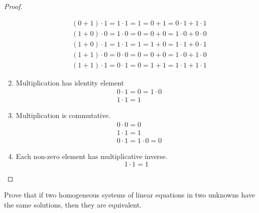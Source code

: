 \begin{proof}
\begin{enumerate}[label = (\arabic*)]
\[\begin{split}
                      &(0 + 1)\cdot 1 = 1\cdot 1 = 1 = 0 + 1 = 0\cdot 1 + 1\cdot 1 \\
                      &(1 + 0)\cdot 0 = 1\cdot 0 = 0 = 0 + 0 = 1\cdot 0 + 0\cdot 0 \\
                      &(1 + 0)\cdot 1 = 1\cdot 1 = 1 = 1 + 0 = 1\cdot 1 + 0\cdot 1 \\
                      &(1 + 1)\cdot 0 = 0\cdot 0 = 0 = 0 + 0 = 1\cdot 0 + 1\cdot 0 \\
                      &(1 + 1)\cdot 1 = 0\cdot 1 = 0 = 1 + 1 = 1\cdot 1 + 1\cdot 1
                  \end{split}
              \]
        \item Multiplication has identity element
              \[
                  \begin{split}
                      &0\cdot 1 = 0 = 1\cdot 0 \\
                      &1\cdot 1 = 1
                  \end{split}
              \]
        \item Multiplication is commutative.
              \[
                  \begin{split}
                      &0\cdot 0 = 0 \\
                      &1\cdot 1 = 1 \\
                      &0\cdot 1 = 1\cdot 0 = 0
                  \end{split}
              \]
        \item Each non-zero element has multiplicative inverse.
              \[
                  1\cdot 1 = 1
              \]
    \end{enumerate}
\end{proof}

\begin{exercise}
    Prove that if two homogeneous systems of linear equations in two unknowns have the same solutions, then they are equivalent.
\end{exercise}

